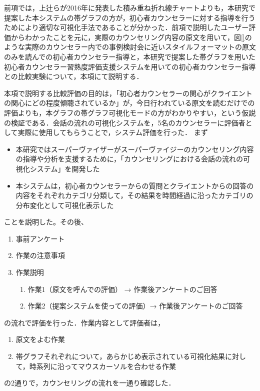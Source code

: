 \documentclass[shuuron]{kuee}
\begin{document}
前項では，上辻ら\cite{uetsuji}が2016年に発表した積み重ね折れ線チャートよりも，本研究で提案した本システムの帯グラフの方が，初心者カウンセラーに対する指導を行うためにより適切な可視化手法であることが分かった．前項で説明したユーザー評価からわかったことを元に，実際のカウンセリング内容の原文を用いて，図\ref{}のような実際のカウンセラー内での事例検討会に近いスタイルフォーマットの原文のみを読んでの初心者カウンセラー指導と，本研究で提案した帯グラフを用いた初心者カウンセラー習熟度評価支援システムを用いての初心者カウンセラー指導との比較実験について，本項にて説明する．

本項で説明する比較評価の目的は，「初心者カウンセラーの関心がクライエントの関心にどの程度傾聴されているか」が，今日行われている原文を読むだけでの評価よりも，本グラフの帯グラフ可視化モードの方がわかりやすい，という仮説の検証である．会話の流れの可視化システムを，5名のカウンセラーに評価者として実際に使用してもらうことで，システム評価を行った．
まず
\begin{itemize}
  \item 本研究ではスーパーヴァイザーがスーパーヴァイジーのカウンセリング内容の指導や分析を支援するために，「カウンセリングにおける会話の流れの可視化システム」を開発した
  \item 本システムは，初心者カウンセラーからの質問とクライエントからの回答の内容をそれぞれカテゴリ分類して，その結果を時間経過に沿ったカテゴリの分布変化として可視化表示した
\end{itemize}
ことを説明した。その後、


\begin{enumerate}

  \item 事前アンケート
  \item 作業の注意事項
  \item 作業説明
  \begin{enumerate}
    \item 作業1（原文を呼んでの評価） → 作業後アンケートのご回答
    \item 作業2（提案システムを使っての評価）→ 作業後アンケートのご回答
  \end{enumerate}
\end{enumerate}
の流れで評価を行った．作業内容として評価者は，
\begin{enumerate}
  \item 原文をよむ作業
  \item 帯グラフそれぞれについて，あらかじめ表示されている可視化結果に対して，時系列に沿ってマウスカーソルを合わせる作業
\end{enumerate}
の2通りで，カウンセリングの流れを一通り確認した．
\end{document}
